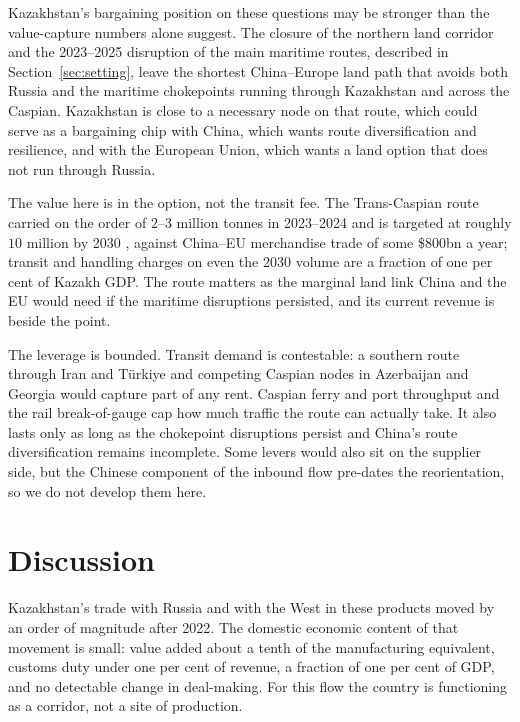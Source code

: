 \documentclass[12pt]{article}
\begin{document}
Kazakhstan's bargaining position on these questions may be stronger than the value-capture numbers alone suggest. The closure of the northern land corridor and the 2023--2025 disruption of the
main maritime routes, described in Section~\ref{sec:setting}, leave the shortest China--Europe
land path that avoids both Russia and the maritime chokepoints running through Kazakhstan and
across the Caspian. Kazakhstan is close to a necessary node on that route, which could serve as a bargaining chip with China, which wants route diversification and resilience, and with the
European Union, which wants a land option that does not run through Russia.

The value here is in the option, not the transit fee. The Trans-Caspian route
carried on the order of $2$--$3$ million tonnes in 2023--2024 and is targeted at roughly
$10$ million by 2030 \citep{worldbank2023middlecorridor}, against China--EU merchandise trade
of some \$800bn a year; transit and handling charges on even the 2030 volume are a fraction of
one per cent of Kazakh GDP. The route matters as the marginal
land link China and the EU would need if the maritime disruptions persisted, and its current
revenue is beside the point.

The leverage is bounded. Transit demand is contestable: a southern route through Iran and
T\"urkiye and competing Caspian nodes in Azerbaijan and Georgia would capture part of any
rent. Caspian ferry and port throughput and the rail break-of-gauge cap how much traffic the
route can actually take. It also lasts only as long as the chokepoint disruptions persist and
China's route diversification remains incomplete. Some levers would also sit on the supplier side, but the Chinese component of the inbound flow pre-dates the reorientation, so we do not develop them here.

\section{Discussion}\label{sec:discussion}

Kazakhstan's trade with Russia and with the West in these products moved by an order of
magnitude after 2022. The domestic economic content of that movement is small: value added
about a tenth of the manufacturing equivalent, customs duty under one per cent of revenue, a
fraction of one per cent of GDP, and no detectable change in deal-making. For this flow the country is functioning as a corridor, not a site of production.
\end{document}
